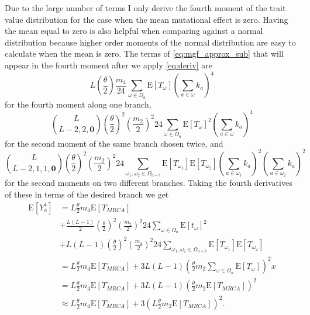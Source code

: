 \documentclass{article}
\newcommand{\T}{\frac{\theta}{2}}
\newcommand{\E}{\mathrm{E}}
\begin{document}
Due to the large number of terms I only derive the fourth moment of the trait
value distribution for the case when the mean mutational effect is zero. Having
the mean equal to zero is also helpful when comparing against a normal
distribution because higher order moments of the normal distribution are easy to
calculate when the mean is zero. The terms of \eqref{eq:mgf_approx_sub} that
will appear in the fourth moment after we apply \eqref{eq:deriv} are
\begin{equation*}
  L \left(\T\right) \frac{m_4}{24}
  \sum_{\omega \in \Omega_a} \E[T_\omega] \left(\sum_{a \in \omega} k_a\right)^4
\end{equation*}
for the fourth moment along one branch,
\begin{equation*}
  \binom{L}{L-2,2,\mathbf{0}}\left(\T\right)^2\left(\frac{m_2}{2}\right)^2
  24 \sum_{\omega \in \Omega_a} \E[T_\omega]^2 \left(\sum_{a \in \omega} k_a\right)^4
\end{equation*}
for the second moment of the same branch chosen twice, and
\begin{equation*}
  \binom{L}{L-2,1,1,\mathbf{0}}\left(\T\right)^2\left(\frac{m_2}{2}\right)^2
  24 \sum_{\omega_1 , \omega_2 \in \Omega_{a+b}} \E[T_{\omega_1}]\E[T_{\omega_2}]
  \left(\sum_{a \in \omega_1} k_a\right)^2\left(\sum_{a \in \omega_2} k_a\right)^2
\end{equation*}
for the second moments on two different branches. Taking the fourth derivatives
of these in terms of the desired branch we get
\begin{align}
  \label{eq:mom4}
  \E[Y_a^4] &= L\T m_4 \E[T_{MRCA}] \nonumber \\
  &+ \frac{L(L-1)}{2} \left(\T\right)^2\left( \frac{m_2}{2} \right)^2
  24 \sum_{\omega \in \Omega_a} \E[t_\omega]^2 \nonumber \\
  &+ L(L-1) \left(\T\right)^2\left( \frac{m_2}{2} \right)^2
  24 \sum_{\omega_1 , \omega_2 \in \Omega_{a+b}} \E[T_{\omega_1}]\E[T_{\omega_2}] \nonumber \\
  &= L\T m_4 \E[T_{MRCA}] +
  3L(L-1)\left( \T m_2 \sum_{\omega \in \Omega_a} \E[T_\omega] \right)^2x \nonumber \\
  &= L\T m_4 \E[T_{MRCA}] +
  3L(L-1)\left( \T m_2 \E[T_{MRCA}] \right)^2 \\
  &\approx L\T m_4 \E[T_{MRCA}] +
  3\left(L \T m_2 \E[T_{MRCA}] \right)^2. \nonumber 
\end{align}
\end{document}
